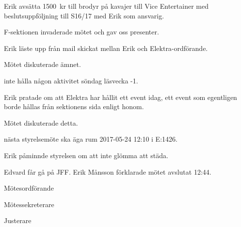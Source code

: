 \documentclass[10pt]{article}
\def\mo{Erik Månsson}
\def\ms{Johan Karlberg}
\def\ji{Albin Nyström Eklund}
\begin{document}
\begin{paragrafer}
Erik \ypa avsätta \SI{1500}{kr} till brodyr på kavajer till Vice Entertainer med beslutsuppföljning till S16/17 med Erik som ansvarig.

F-sektionen invaderade mötet och gav oss presenter.

Erik läste upp från mail skickat mellan Erik och Elektra-ordförande.

Mötet diskuterade ämnet.

\Mba inte hålla någon aktivitet söndag läsvecka -1.

Erik pratade om att Elektra har hållit ett event idag, ett event som egentligen borde hållas från sektionens sida enligt honom.

Mötet diskuterade detta.

{\Mba} nästa styrelsemöte ska äga rum 2017-05-24 12:10 i E:1426.

{\Ibfu}

Erik påminnde styrelsen om att inte glömma att städa.

Edvard får gå på JFF.
{\mo} förklarade mötet avslutat 12:44.

\end{paragrafer}

\newpage
\hidesignfoot
\begin{signatures}{3}
\signature{\mo}{Mötesordförande}
\signature{\ms}{Mötessekreterare}
\signature{\ji}{Justerare}
\end{signatures}
\end{document}
